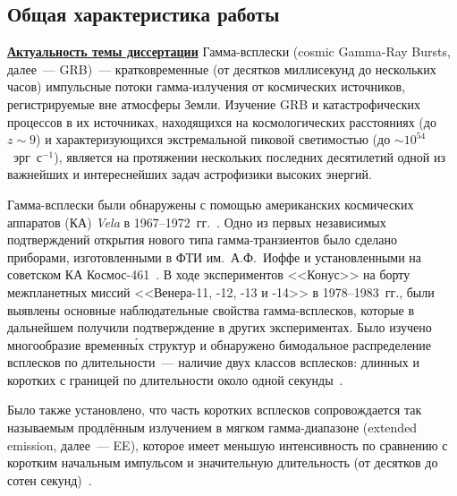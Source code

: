 \subsection*{\Large Общая характеристика работы}
\fontsize{14pt}{15pt}\selectfont
\underline{\textbf{Актуальность темы диссертации}}
Гамма-всплески (cosmic Gamma-Ray Bursts, далее~--- GRB)~--- кратковременные 
(от десятков миллисекунд до нескольких часов) импульсные потоки гамма-излучения  
от космических источников, регистрируемые вне атмосферы Земли. 
Изучение GRB и катастрофических процессов в их  источниках, находящихся на 
космологических расстояниях (до $z\sim9$) и характеризующихся экстремальной пиковой 
светимостью (до $\sim 10^{54}$~эрг~с$^{-1}$), является на протяжении нескольких 
последних десятилетий одной из важнейших и интереснейших задач астрофизики высоких энергий.

Гамма-всплески были обнаружены с помощью американских космических 
аппаратов (КА) \textit{Vela} в 1967--1972~гг.~\citep{Klebesadel_1973ApJ}. 
Одно из первых независимых подтверждений открытия нового типа гамма-транзиентов 
было сделано приборами, изготовленными в ФТИ им.~А.Ф.~Иоффе и установленными 
на советском КА Космос-461~\citep{Mazets_1974PZETF_ru}. В ходе экспериментов <<Конус>> 
на борту межпланетных миссий <<Венера-11, -12, -13 и -14>> в 1978--1983~гг., были выявлены
основные наблюдательные свойства гамма-всплесков, которые в дальнейшем получили 
подтверждение в других экспериментах. Было изучено многообразие временн\'{ы}х структур
и обнаружено бимодальное распределение всплесков по длительности~--- 
наличие двух классов всплесков: длинных и коротких с границей по длительности 
около одной секунды~\citep{Mazets_1981_part_1}.

Было также установлено, что часть коротких всплесков
сопровождается так называемым продлённым излучением в мягком гамма-диапазоне 
(extended emission, далее~--- EE), которое имеет меньшую интенсивность 
по сравнению с коротким начальным импульсом и значительную длительность 
(от десятков до сотен секунд)~\citep{Burenin_2000AstL,Frederiks_2004ASPC,Norris_and_Bonnel_2006ApJ}.

